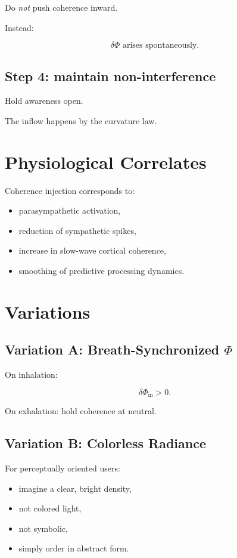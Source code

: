 \documentclass[12pt]{article}
\begin{document}
Do \emph{not} push coherence inward.

Instead:

\[
\delta\Phi \text{ arises spontaneously}.
\]

\subsection*{Step 4: maintain non-interference}

Hold awareness open.

The inflow happens by the curvature law.

\section{Physiological Correlates}

Coherence injection corresponds to:

\begin{itemize}
    \item parasympathetic activation,
    \item reduction of sympathetic spikes,
    \item increase in slow-wave cortical coherence,
    \item smoothing of predictive processing dynamics.
\end{itemize}

\section{Variations}

\subsection{Variation A: Breath-Synchronized $\Phi$}

On inhalation:

\[
\delta\Phi_{\text{in}} > 0.
\]

On exhalation: hold coherence at neutral.

\subsection{Variation B: Colorless Radiance}

For perceptually oriented users:

\begin{itemize}
    \item imagine a clear, bright density,
    \item not colored light,
    \item not symbolic,
    \item simply order in abstract form.
\end{itemize}
\end{document}
